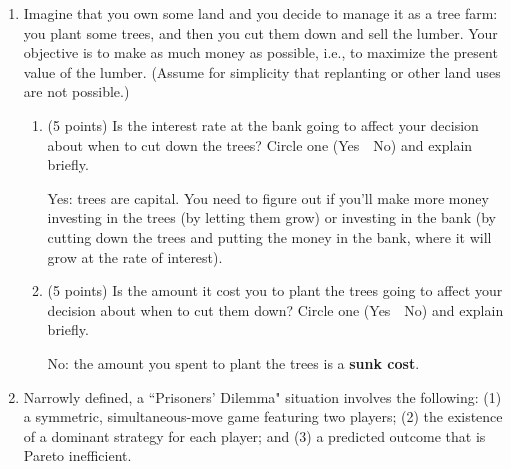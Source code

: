 \documentclass{article}
\begin{document}
\begin{enumerate}




\item \begin{EXAM}Imagine that you own some land and you decide to manage it as a tree farm: you plant some trees, and then you cut them down and sell the lumber. Your objective is to make as much money as possible, i.e., to maximize the present value of the lumber. (Assume for simplicity that replanting or other land uses are not possible.) \end{EXAM}
    \begin{enumerate}
    \item \begin{EXAM} (5 points) Is the interest rate at the bank going to affect your decision about when to cut down the trees? Circle one (Yes\ \ No) and explain briefly. \vspace{5cm}\end{EXAM}

\begin{KEY}
Yes: trees are capital. You need to figure out if you'll make more money investing in the trees (by letting them grow) or investing in the bank (by cutting down the trees and putting the money in the bank, where it will grow at the rate of interest).
\end{KEY}

    \item \begin{EXAM} (5 points) Is the amount it cost you to plant the trees going to affect your decision about when to cut them down? Circle one (Yes\ \ No) and explain briefly. \vspace{4cm}\end{EXAM}

\begin{KEY}
No: the amount you spent to plant the trees is a \textbf{sunk cost}.
\end{KEY}
    \end{enumerate}









\item \begin{EXAM} Narrowly defined, a ``Prisoners' Dilemma" situation involves the following: (1) a symmetric, simultaneous-move game featuring two players; (2) the existence of a dominant strategy for each player; and (3) a predicted outcome that is Pareto inefficient.  \end{EXAM}


\end{enumerate}
\end{document}
